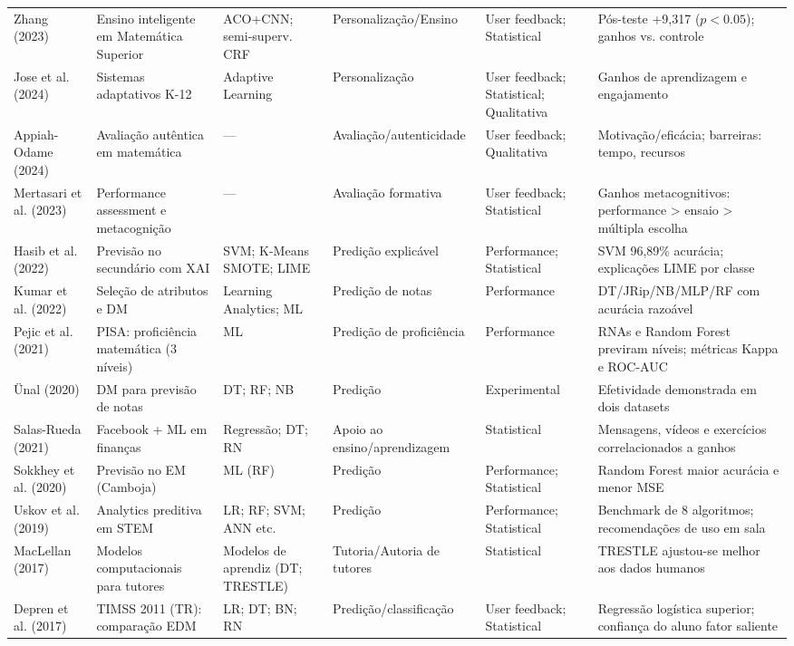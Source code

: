 \begin{landscape}
\begin{longtable}{p{2.1cm}p{3.2cm}p{2.2cm}p{2.2cm}p{1.7cm}p{7.5cm}}
Zhang (2023) & Ensino inteligente em Matemática Superior & ACO+CNN; semi-superv. CRF & Personalização/Ensino & User feedback; Statistical & Pós-teste +9,317 ($p<0.05$); ganhos vs. controle \\
Jose et al. (2024) & Sistemas adaptativos K-12 & Adaptive Learning & Personalização & User feedback; Statistical; Qualitativa & Ganhos de aprendizagem e engajamento \\
Appiah-Odame (2024) & Avaliação autêntica em matemática & --- & Avaliação/autenticidade & User feedback; Qualitativa & Motivação/eficácia; barreiras: tempo, recursos \\
Mertasari et al. (2023) & Performance assessment e metacognição & --- & Avaliação formativa & User feedback; Statistical & Ganhos metacognitivos: performance > ensaio > múltipla escolha \\
Hasib et al. (2022) & Previsão no secundário com XAI & SVM; K-Means SMOTE; LIME & Predição explicável & Performance; Statistical & SVM 96,89\% acurácia; explicações LIME por classe \\
Kumar et al. (2022) & Seleção de atributos e DM & Learning Analytics; ML & Predição de notas & Performance & DT/JRip/NB/MLP/RF com acurácia razoável \\
Pejic et al. (2021) & PISA: proficiência matemática (3 níveis) & ML & Predição de proficiência & Performance & RNAs e Random Forest previram níveis; métricas Kappa e ROC-AUC \\
Ünal (2020) & DM para previsão de notas & DT; RF; NB & Predição & Experimental & Efetividade demonstrada em dois datasets \\
Salas-Rueda (2021) & Facebook + ML em finanças & Regressão; DT; RN & Apoio ao ensino/aprendizagem & Statistical & Mensagens, vídeos e exercícios correlacionados a ganhos \\
Sokkhey et al. (2020) & Previsão no EM (Camboja) & ML (RF) & Predição & Performance; Statistical & Random Forest maior acurácia e menor MSE \\
Uskov et al. (2019) & Analytics preditiva em STEM & LR; RF; SVM; ANN etc. & Predição & Performance; Statistical & Benchmark de 8 algoritmos; recomendações de uso em sala \\
MacLellan (2017) & Modelos computacionais para tutores & Modelos de aprendiz (DT; TRESTLE) & Tutoria/Autoria de tutores & Statistical & TRESTLE ajustou-se melhor aos dados humanos \\
Depren et al. (2017) & TIMSS 2011 (TR): comparação EDM & LR; DT; BN; RN & Predição/classificação & User feedback; Statistical & Regressão logística superior; confiança do aluno fator saliente \\
\end{longtable}
\end{landscape}

